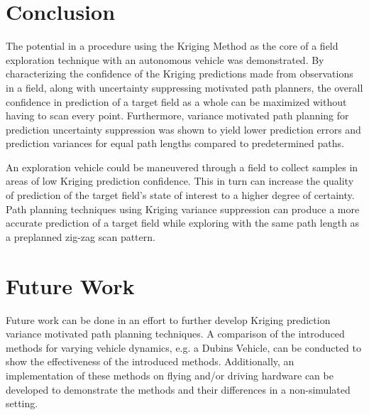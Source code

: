 \chapter*{Conclusion}
The potential in a procedure using the Kriging Method as the core of a field exploration technique with an autonomous vehicle was demonstrated. By characterizing the confidence of the Kriging predictions made from observations in a field, along with uncertainty suppressing motivated path planners, the overall confidence in prediction of a target field as a whole can be maximized without having to scan every point. Furthermore, variance motivated path planning for prediction uncertainty suppression was shown to yield lower prediction errors and prediction variances for equal path lengths compared to predetermined paths.

An exploration vehicle could be maneuvered through a field to collect samples in areas of low Kriging prediction confidence. This in turn can increase the quality of prediction of the target field's state of interest to a higher degree of certainty. Path planning techniques using Kriging variance suppression can produce a more accurate prediction of a target field while exploring with the same path length as a preplanned zig-zag scan pattern.

\chapter*{Future Work}
Future work can be done in an effort to further develop Kriging prediction variance motivated path planning techniques. A comparison of the introduced methods for varying vehicle dynamics, e.g. a Dubins Vehicle, can be conducted to show the effectiveness of the introduced methods. Additionally, an implementation of these methods on flying and/or driving hardware can be developed to demonstrate the methods and their differences in a non-simulated setting.


